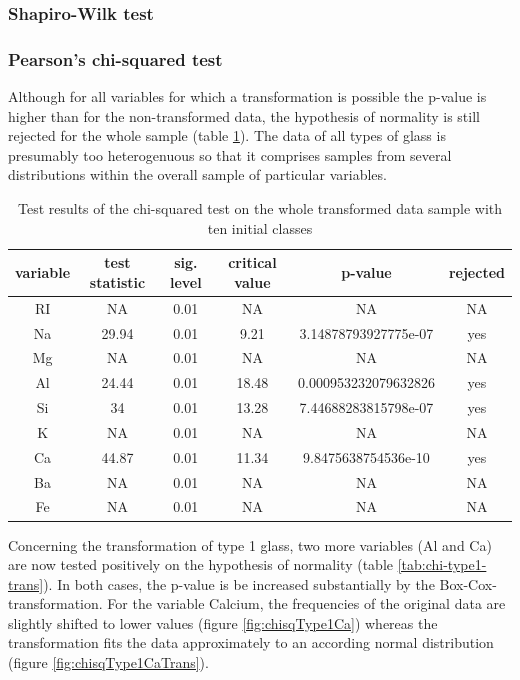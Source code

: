 \documentclass[a4paper, 12pt, titlepage, headsepline, listof = totoc, bibliography = totoc, numbers = noenddot]{scrartcl}
\begin{document}
\subsubsection{Shapiro-Wilk test}

\subsubsection{Pearson's chi-squared test}
Although for all variables for which a transformation is possible the p-value is higher than for the non-transformed data, the hypothesis of normality is still rejected for the whole sample (table \ref{tab:chi-full-trans}). The data of all types of glass is presumably too heterogenuous so that it comprises samples from several distributions within the overall sample of particular variables.

\begin{table}[h!]
\centering
\begin{tabular}{|cccccc|} \hline variable & test statistic & sig. level & critical value & p-value & rejected\\ \hline RI & NA & 0.01 & NA & NA & NA\\ 
Na & 29.94 & 0.01 & 9.21 & 3.14878793927775e-07 & yes\\ 
Mg & NA & 0.01 & NA & NA & NA\\ 
Al & 24.44 & 0.01 & 18.48 & 0.000953232079632826 & yes\\ 
Si & 34 & 0.01 & 13.28 & 7.44688283815798e-07 & yes\\ 
K & NA & 0.01 & NA & NA & NA\\ 
Ca & 44.87 & 0.01 & 11.34 & 9.8475638754536e-10 & yes\\ 
Ba & NA & 0.01 & NA & NA & NA\\ 
Fe & NA & 0.01 & NA & NA & NA\\ \hline \end{tabular}\caption{Test results of the chi-squared test on the whole transformed data sample with ten initial classes}
\label{tab:chi-full-trans}
\end{table}

Concerning the transformation of type 1 glass, two more variables (Al and Ca) are now tested positively on the hypothesis of normality (table \ref{tab:chi-type1-trans}). In both cases, the p-value is be increased substantially by the Box-Cox-transformation. For the variable Calcium, the frequencies of the original data are slightly shifted to lower values (figure \ref{fig:chisqType1Ca}) whereas the transformation fits the data approximately to an according normal distribution (figure \ref{fig:chisqType1CaTrans}).
\end{document}
